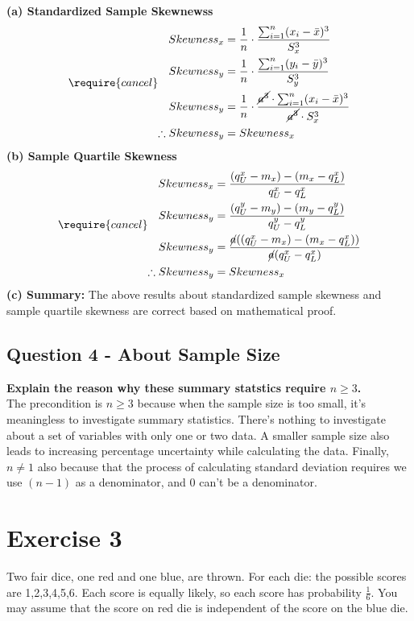 \documentclass[
]{book}
\begin{document}
\textbf{(a) Standardized Sample Skewnewss}
\[\require{cancel}
\begin{aligned} 
Skewness_x &= \frac{1}{n} \cdot \frac{\sum_{i=1}^{n} (x_i - \bar{x})^3}{S_x^3} \\
Skewness_y &= \frac{1}{n} \cdot \frac{\sum_{i=1}^{n} (y_i - \bar{y})^3}{S_y^3} \\
Skewness_y &= \frac{1}{n} \cdot \frac{\cancel{a^3} \cdot \sum_{i=1}^{n} (x_i - \bar{x})^3}{\cancel{a^3} \cdot S_x^3} \\
\therefore Skewness_y &= Skewness_x
\end{aligned}\]
\textbf{(b) Sample Quartile Skewness}
\[\require{cancel}
\begin{aligned}
Skewness_x &= \frac{(q_U^x - m_x) - (m_x - q_L^x)}{q_U^x - q_L^x} \\
Skewness_y &= \frac{(q_U^y - m_y) - (m_y - q_L^y)}{q_U^y - q_L^y} \\
Skewness_y &= \frac{\cancel{a}((q_U^x - m_x) - (m_x - q_L^x))}{\cancel{a}(q_U^x - q_L^x)} \\
\therefore Skewness_y &= Skewness_x
\end{aligned}\]
\textbf{(c) Summary: } The above results about standardized sample skewness and sample quartile skewness are correct based on mathematical proof.

\section{Question 4 - About Sample Size}\label{question-4---about-sample-size}

\textbf{Explain the reason why these summary statstics require \(n \geq 3\).}\\
The precondition is \(n \geq 3\) because when the sample size is too small, it's meaningless to investigate summary statistics. There's nothing to investigate about a set of variables with only one or two data. A smaller sample size also leads to increasing percentage uncertainty while calculating the data. Finally, \(n \neq 1\) also because that the process of calculating standard deviation requires we use \((n-1)\) as a denominator, and 0 can't be a denominator.

\chapter{Exercise 3}\label{exercise-3}

Two fair dice, one red and one blue, are thrown. For each die: the possible scores are 1,2,3,4,5,6. Each
score is equally likely, so each score has probability \(\frac{1}{6}\). You may assume that the score on red die is
independent of the score on the blue die.
\end{document}
